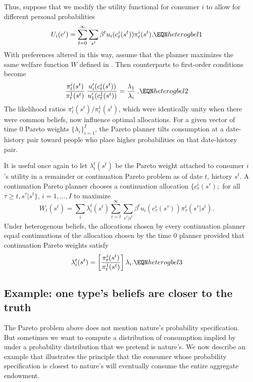 Thus, suppose that we modify  the utility functional  for consumer $i$
to allow for different personal probabilities
$$ U_i(c^i) = \sum_{t=0}^\infty \sum_{s^t} \beta^t u_i(c^i_t(s^t))
\pi_t^i(s^t) .  \EQN heterogbel1 $$
With preferences altered in this way, assume that the planner
maximizes the same welfare function $W$ defined in .    Then  counterparts to first-order conditions  become
$$ {\frac{\pi_t^i(s^t)}{\pi_t^1(s^t)}} \;
{\frac{u_i^\prime(c^i_t(s^t))}{u_1^\prime(c^1_t(s^t))}}
 = {\frac{\lambda_1}{\lambda_i}} \; .
                                                    \EQN heterogbel2 $$
The likelihood ratios $ \pi_t^i(s^t) / \pi_t^1(s^t) $, %
 which were identically unity when there were common beliefs, now influence optimal allocations.
For a given vector of time $0$  Pareto weights $\{\lambda_i\}_{i=1}^I$, the Pareto planner tilts consumption  at a date-history pair toward
people who place higher probabilities on that date-history pair.


It is useful once again to let $\lambda^t_i(s^t)$ be the
Pareto weight attached to consumer $i$'s utility in a
remainder or continuation Pareto problem as of date $t$, history $s^t$.  A continuation Pareto
planner chooses a continuation allocation
$\{c_{\tau}^i(s^\tau);$ for all $\tau\geq t,s^\tau | s^t\}$,
$i = 1, \ldots , I$  to maximize
$$ W_t(s^t) = \sum_i \lambda^t_i(s^t)
\sum_{\tau = t}^\infty \sum_{s^\tau | s^t}
\beta^t u_i(c_{\tau}^i(s^\tau)) \pi_{\tau}^i(s^\tau | s^t) .$$
Under heterogenous
beliefs, the allocations chosen by every  continuation  planner  equal  continuations of the allocation chosen by the time $0$ planner provided that
 continuation Pareto weights satisfy
$$
\lambda^t_i(s^t) =  \left[ \pi_t^i(s^t) \over \pi_t^1(s^t) \right]
                    \lambda_i.       \EQN heterogbel3
$$

%

\subsection{Example: one type's beliefs are closer to the truth}
\label{sec:heterogbel_example}%

\noindent
The  Pareto problem above does not mention nature's probability specification.
 But sometimes we want to compute
a distribution of consumption implied by
 under a probability distribution that we pretend is nature's.
We now describe an  example that illustrates the principle that
 the consumer whose probability specification is closest to nature's
will eventually consume the entire aggregate endowment.

